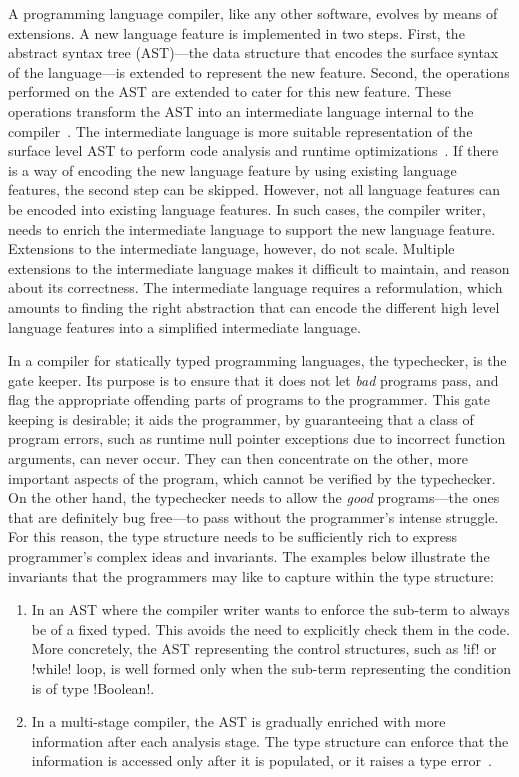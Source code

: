 \documentclass[screen,nonacm,manuscript,review]{acmart} %
\begin{document}
A programming language compiler, like any other software,
evolves by means of extensions. A new language feature
is implemented in two steps. First, the abstract syntax tree (AST)---the
data structure that encodes the surface syntax of the language---is
extended to represent the new feature. Second, the operations
performed on the AST are extended to cater for this new feature. These
operations transform the AST into an intermediate language internal to the
compiler~\cite{siek_compilation_2023}. The intermediate language is more suitable
representation of the surface level AST to perform code analysis and
runtime optimizations~\cite{aho_compilers_1986}.
If there is a way of encoding the new language feature by using
existing language features, the second step can be
skipped. However, not all language features can be encoded
into existing language features. In such cases, the compiler writer, needs
to enrich the intermediate language to support the
new language feature. Extensions to the intermediate language,
however, do not scale. Multiple extensions to the intermediate
language makes it difficult to maintain, and reason about its correctness.
The intermediate language requires a reformulation,
which amounts to finding the right
abstraction that can encode the different high level language features
into a simplified intermediate language.

In a compiler for statically typed programming languages, the
typechecker, is the gate keeper. Its purpose is to ensure that it does
not let \emph{bad} programs pass, and flag the appropriate offending
parts of programs to the programmer. This gate keeping is desirable;
it aids the programmer, by guaranteeing that a class of program
errors, such as runtime null pointer exceptions due to incorrect
function arguments, can never occur. They can then concentrate on the
other, more important aspects of the program, which cannot be verified
by the typechecker. On the other hand, the typechecker needs to allow
the \emph{good} programs---the ones that are definitely bug free---to
pass without the programmer's intense struggle. For
this reason, the type structure needs to be sufficiently rich
to express programmer's complex ideas and invariants.
The examples below illustrate the invariants
that the programmers may like to capture within the type structure:
\begin{enumerate}
\item In an AST where the compiler writer wants to enforce the
  sub-term to always be of a fixed typed. This avoids the need to
  explicitly check them in the code.
  More concretely, the AST representing the control structures, such
  as !if! or !while! loop, is well formed only when the sub-term
  representing the condition is of type !Boolean!.
\item In a multi-stage compiler, the AST is gradually enriched with
  more information after each analysis stage. The type structure can
  enforce that the information is accessed only after it is populated,
  or it raises a type error~\cite{peyton_jones_trees_2017}.
\end{enumerate}
\end{document}
